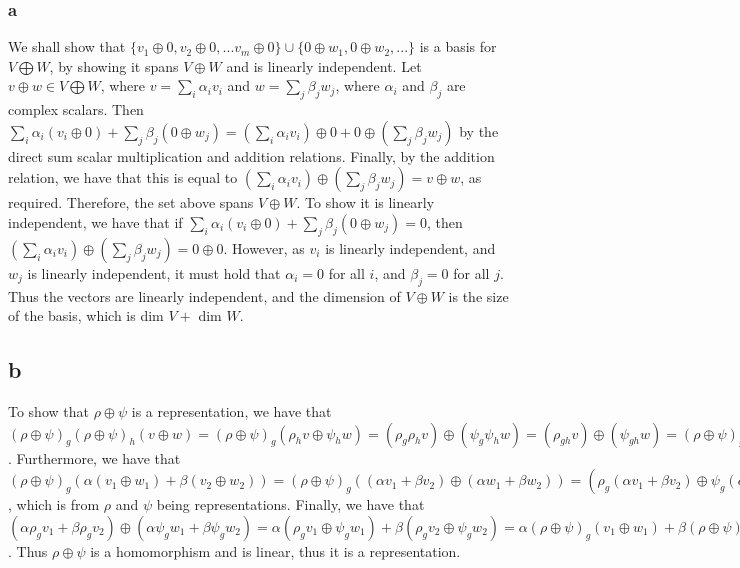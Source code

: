 \documentclass[]{article}
\begin{document}
\subsubsection*{a}
We shall show that $\lbrace v_1 \oplus 0, v_2 \oplus 0, ... v_m \oplus 0 \rbrace \cup \lbrace 0 \oplus w_1, 0 \oplus w_2, ... \rbrace$ is a basis for $V \bigoplus W$, by showing it spans $V \oplus W$ and is linearly independent. Let $v \oplus w \in V \bigoplus W$, where $v = \sum_i \alpha_i v_i$ and $w = \sum_j \beta_j w_j$, where $\alpha_i$ and $\beta_j$ are complex scalars. Then $\sum_i \alpha_i( v_i\oplus 0) + \sum_j \beta_j( 0 \oplus w_j) = (\sum_i \alpha_i v_i) \oplus 0 + 0 \oplus (\sum_j \beta_j w_j)$ by the direct sum scalar multiplication and addition relations. Finally, by the addition relation, we have that this is equal to $(\sum_i \alpha_i v_i) \oplus (\sum_j \beta_j w_j) = v \oplus w$, as required. Therefore, the set above spans $V \oplus W$. To show it is linearly independent, we have that if $\sum_i \alpha_i (v_i \oplus 0) + \sum_j \beta_j (0 \oplus w_j) = 0$, then $(\sum_i \alpha_i v_i) \oplus (\sum_j \beta_j w_j) = 0 \oplus 0$. However, as $v_i$ is linearly independent, and $w_j$ is linearly independent, it must hold that $\alpha_i = 0$ for all $i$, and $\beta_j = 0$ for all $j$. Thus the vectors are linearly independent, and the dimension of $V \oplus W$ is the size of the basis, which is dim $V + $ dim $W$.

\subsection*{b}
To show that $\rho \oplus \psi$ is a representation, we have that $(\rho \oplus \psi)_g (\rho \oplus \psi)_h (v \oplus w) = (\rho \oplus \psi)_g (\rho_h v \oplus \psi_h w)  = (\rho_g \rho_h v) \oplus (\psi_g \psi_h w) = (\rho_{gh} v) \oplus (\psi_{gh} w) = (\rho \oplus \psi)_{gh} v \oplus w$. Furthermore, we have that $(\rho \oplus \psi)_g (\alpha(v_1 \oplus w_1) + \beta(v_2 \oplus w_2)) = (\rho \oplus \psi)_g ((\alpha v_1 + \beta v_2) \oplus (\alpha w_1 + \beta w_2)) = (\rho_g (\alpha v_1 + \beta v_2) \oplus \psi_g (\alpha w_1 + \beta w_2)) = (\alpha \rho_g v_1 + \beta \rho_g v_2) \oplus (\alpha \psi_g w_1 + \beta \psi_g w_2)$, which is from $\rho$ and $\psi$ being representations. Finally, we have that $(\alpha \rho_g v_1 + \beta \rho_g v_2) \oplus (\alpha \psi_g w_1 + \beta \psi_g w_2) = \alpha (\rho_g v_1 \oplus \psi_g w_1) + \beta (\rho_g v_2 \oplus \psi_g w_2) = \alpha (\rho \oplus \psi)_g (v_1 \oplus w_1) + \beta (\rho \oplus \psi)_h (v_2 \oplus w_2)$. Thus $\rho \oplus \psi$ is a homomorphism and is linear, thus it is a representation. 
\end{document}
